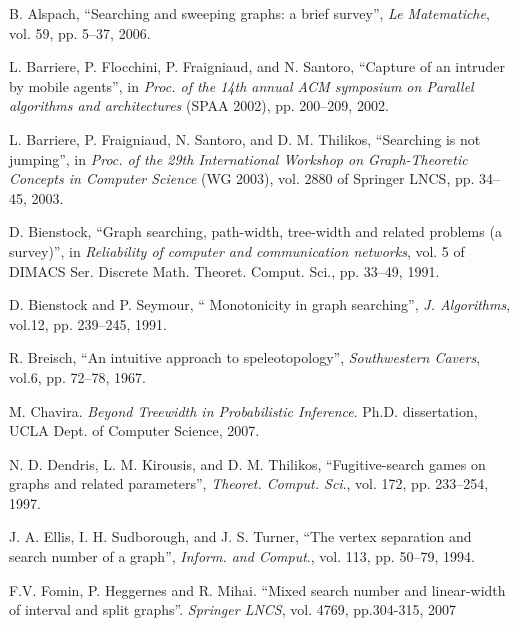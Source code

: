 \documentclass[11pt]{article}\usepackage{amsmath}
\begin{document}
\begin{thebibliography}{99}                                                                                               


B. Alspach, \textquotedblleft Searching and sweeping graphs:
a brief survey\textquotedblright, \emph{Le Matematiche}, vol. 59, pp. 5--37, 2006.

L. Barriere, P. Flocchini, P. Fraigniaud, and N. Santoro,
\textquotedblleft Capture of an intruder by mobile agents\textquotedblright,
in \emph{Proc. of the 14th annual ACM symposium on Parallel algorithms and
architectures }(SPAA 2002), pp. 200--209, 2002.

L. Barriere, P. Fraigniaud, N. Santoro, and D. M.
Thilikos, \textquotedblleft Searching is not jumping\textquotedblright, in
\emph{Proc. of the 29th International Workshop on Graph-Theoretic Concepts in
Computer Science }(WG 2003), vol. 2880 of Springer LNCS, pp. 34--45, 2003.

D. Bienstock, \textquotedblleft Graph searching,
path-width, tree-width and related problems (a survey)\textquotedblright, in
\emph{Reliability of computer and communication networks}, vol. 5 of DIMACS
Ser. Discrete Math. Theoret. Comput. Sci., pp. 33--49, 1991.

D. Bienstock and P. Seymour, \textquotedblleft
Monotonicity in graph searching\textquotedblright, \emph{J. Algorithms},
vol.12, pp. 239--245, 1991.

R. Breisch, \textquotedblleft An intuitive approach to
speleotopology\textquotedblright, \emph{Southwestern Cavers}, vol.6, pp.
72--78, 1967.

M. Chavira. \emph{Beyond Treewidth in Probabilistic
Inference}. Ph.D. dissertation, UCLA Dept. of Computer Science, 2007.

N. D. Dendris, L. M. Kirousis, and D. M. Thilikos,
\textquotedblleft Fugitive-search games on graphs and related
parameters\textquotedblright, \emph{Theoret. Comput. Sci}., vol. 172, pp.
233--254, 1997.

J. A. Ellis, I. H. Sudborough, and J. S. Turner,
\textquotedblleft The vertex separation and search number of a
graph\textquotedblright, \emph{Inform. and Comput}., vol. 113, pp. 50--79, 1994.

F.V. Fomin, P. Heggernes and R. Mihai.
\textquotedblleft Mixed search number and linear-width of interval and split
graphs\textquotedblright. \emph{Springer LNCS}, vol. 4769, pp.304-315, 2007


\end{thebibliography}
\end{document}
